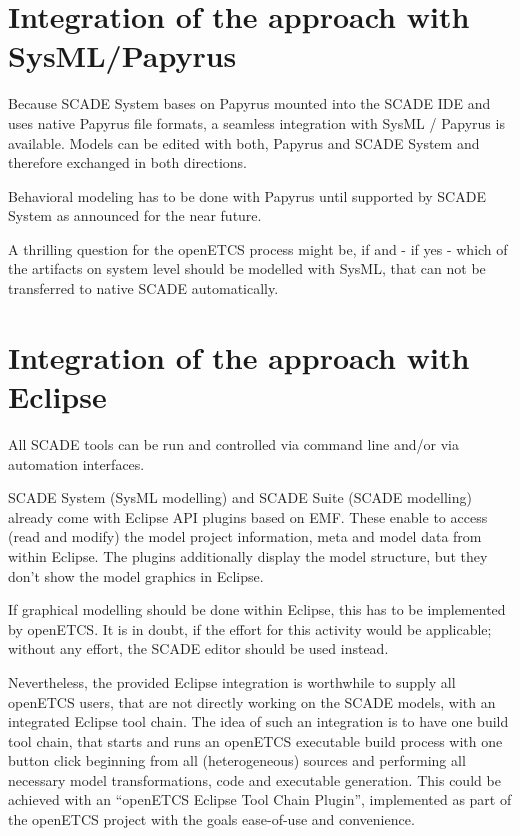 \section{Integration of the approach with SysML/Papyrus}

Because SCADE System bases on Papyrus mounted into the SCADE IDE and uses native Papyrus file formats, a seamless integration with SysML / Papyrus is available.
Models can be edited with both, Papyrus and SCADE System and therefore exchanged in both directions. 

Behavioral modeling has to be done with Papyrus until supported by SCADE System as announced for the near future. 

A thrilling question for the openETCS process might be, if and - if yes - which of the artifacts on system level should be modelled with SysML, that can not be transferred to native SCADE automatically. 


\section{Integration of the approach with Eclipse}

All SCADE tools can be run and controlled via command line and/or via automation interfaces. 

SCADE System (SysML modelling) and SCADE Suite (SCADE modelling) already come with Eclipse API plugins based on EMF. These enable to access (read and modify) the model project information, meta and model data from within Eclipse. 
The plugins additionally display the model structure, but they don't show the model graphics in Eclipse. 

If graphical modelling should be done within Eclipse, this has to be implemented by openETCS. It is in doubt, if the effort for this activity would be applicable; without any effort, the SCADE editor should be used instead. 
 
Nevertheless, the provided Eclipse integration is worthwhile to supply all openETCS users, that are not directly working on the SCADE models, with an integrated Eclipse tool chain. 
The idea of such an integration is to have one build tool chain, that starts and runs an openETCS executable build process with one button click beginning from all (heterogeneous) sources and performing all necessary model transformations, code and executable generation. 
This could be achieved with an "`openETCS Eclipse Tool Chain Plugin"', implemented as part of the openETCS project with the goals ease-of-use and convenience. 

